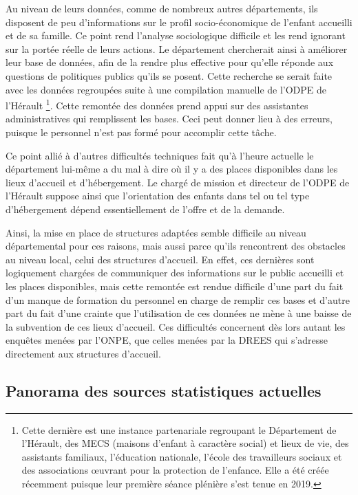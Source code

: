 \documentclass[
  12,
  a4paper,
]{report}
\begin{document}
\begin{mdframed}[frametitle=Exemple d’une rencontre avec un chargé de mission de la direction enfance et famille et de l’ODPE du département de l’Hérault]
Au niveau de leurs données, comme de nombreux autres départements, ils disposent de peu d’informations sur le profil socio-économique de l’enfant accueilli et de sa famille. Ce point rend l’analyse sociologique difficile et les rend ignorant sur la portée réelle de leurs actions. Le département chercherait ainsi à améliorer leur base de données, afin de la rendre plus effective pour qu’elle réponde aux questions de politiques publics qu’ils se posent. Cette recherche se serait faite avec les données regroupées suite à une compilation manuelle de l’ODPE de l’Hérault \footnote{Cette dernière est une instance partenariale regroupant le Département de l’Hérault, des MECS (maisons d’enfant à caractère social) et lieux de vie, des assistants familiaux, l’éducation nationale, l’école des travailleurs sociaux et des associations œuvrant pour la protection de l’enfance. Elle a été créée récemment puisque leur première séance plénière s’est tenue en 2019.
}. Cette remontée des données prend appui sur des assistantes administratives qui remplissent les bases. Ceci peut donner lieu à des erreurs, puisque le personnel n’est pas formé pour accomplir cette tâche. 

Ce point allié à d’autres difficultés techniques fait qu’à l’heure actuelle le département lui-même a du mal à dire où il y a des places disponibles dans les lieux d’accueil et d’hébergement. Le chargé de mission et directeur de l’ODPE de l’Hérault suppose ainsi que l’orientation des enfants dans tel ou tel type d’hébergement dépend essentiellement de l’offre et de la demande.

\end{mdframed}

Ainsi, la mise en place de structures adaptées semble difficile au
niveau départemental pour ces raisons, mais aussi parce qu'ils
rencontrent des obstacles au niveau local, celui des structures
d'accueil. En effet, ces dernières sont logiquement chargées de
communiquer des informations sur le public accueilli et les places
disponibles, mais cette remontée est rendue difficile d'une part du fait
d'un manque de formation du personnel en charge de remplir ces bases et
d'autre part du fait d'une crainte que l'utilisation de ces données ne
mène à une baisse de la subvention de ces lieux d'accueil. Ces
difficultés concernent dès lors autant les enquêtes menées par l'ONPE,
que celles menées par la DREES qui s'adresse directement aux structures
d'accueil.

\hypertarget{panorama-des-sources-statistiques-actuelles}{%
\subsection{Panorama des sources statistiques
actuelles}\label{panorama-des-sources-statistiques-actuelles}}
\end{document}
